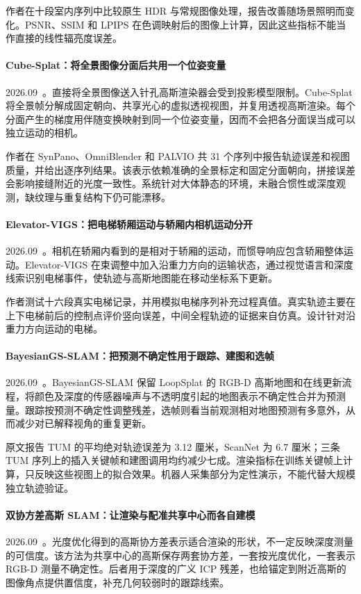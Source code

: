 作者在十段室内序列中比较原生 HDR 与常规图像处理，报告改善随场景照明而变化。PSNR、SSIM 和 LPIPS 在色调映射后的图像上计算，因此这些指标不能当作直接的线性辐亮度误差。

\paragraph{Cube-Splat：将全景图像分面后共用一个位姿变量}
2026.09~\cite{2609_21347}。直接将全景图像送入针孔高斯渲染器会受到投影模型限制。Cube-Splat 将全景帧分解成固定朝向、共享光心的虚拟透视视图，并复用透视高斯渲染。每个分面产生的梯度用伴随变换映射到同一个位姿变量，因而不会把各分面误当成可以独立运动的相机。

作者在 SynPano、OmniBlender 和 PALVIO 共 31 个序列中报告轨迹误差和视图质量，并给出逐序列结果。该表示依赖准确的全景标定和固定分面朝向，拼接误差会影响接缝附近的光度一致性。系统针对大体静态的环境，未融合惯性或深度观测，缺纹理与重复结构下仍可能漂移。

\paragraph{Elevator-VIGS：把电梯轿厢运动与轿厢内相机运动分开}
2026.09~\cite{2609_23491}。相机在轿厢内看到的是相对于轿厢的运动，而惯导响应包含轿厢整体运动。Elevator-VIGS 在束调整中加入沿重力方向的运输状态，通过视觉语言和深度线索识别电梯事件，使轨迹与高斯地图能在移动坐标系下更新。

作者测试十六段真实电梯记录，并用模拟电梯序列补充过程真值。真实轨迹主要在上下电梯前后的控制点评价竖向误差，中间全程轨迹的证据来自仿真。设计针对沿重力方向运动的电梯。

\paragraph{BayesianGS-SLAM：把预测不确定性用于跟踪、建图和选帧}
2026.09~\cite{2609_24140}。BayesianGS-SLAM 保留 LoopSplat 的 RGB-D 高斯地图和在线更新流程，将颜色及深度的传感器噪声与不透明度引起的地图表示不确定性合并为预测量。跟踪按预测不确定性调整残差，选帧则看当前观测相对地图预测有多意外，从而减少对已解释视角的重复更新。

原文报告 TUM 的平均绝对轨迹误差为 3.12 厘米，ScanNet 为 6.7 厘米；三条 TUM 序列上的插入关键帧和建图调用均约减少七成。渲染指标在训练关键帧上计算，只反映这些视图上的拟合效果。机器人采集部分为定性演示，不能代替大规模独立轨迹验证。

\paragraph{双协方差高斯 SLAM：让渲染与配准共享中心而各自建模}
2026.09~\cite{2609_25746}。光度优化得到的高斯协方差表示适合渲染的形状，不一定反映深度测量的可信度。该方法为共享中心的高斯保存两套协方差，一套按光度优化，一套表示 RGB-D 测量不确定性。后者用于深度的广义 ICP 残差，也给锚定到附近高斯的图像角点提供置信度，补充几何较弱时的跟踪线索。

